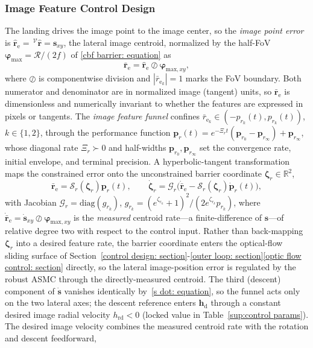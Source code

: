 \documentclass{IEEEtaes}
\begin{document}
\subsubsection{Image Feature Control Design} \label{image point control: section}
The landing drives the image point to the image center, so the \emph{image point error} is $\hat{\boldsymbol{r}}_\text{e}=\,^\mathcal{V}\hat{\boldsymbol{r}}=\boldsymbol{s}_{xy}$, the lateral image centroid, normalized by the half-FoV $\boldsymbol{\varphi}_\text{max}=\mathcal{R}/(2f)$ of \eqref{cbf barrier: equation} as
\begin{equation} \label{normalized error: equation}
    \bar{\boldsymbol{r}}_\text{e} = \hat{\boldsymbol{r}}_\text{e}\oslash\boldsymbol{\varphi}_{\text{max},xy},
\end{equation}
where $\oslash$ is componentwise division and $|\bar{r}_{\text{e}_k}|=1$ marks the FoV boundary. Both numerator and denominator are in normalized image (tangent) units, so $\bar{\boldsymbol{r}}_\text{e}$ is dimensionless and numerically invariant to whether the features are expressed in pixels or tangents. The \emph{image feature funnel} confines $\bar{r}_{\text{e}_k}\in(-p_{r_k}(t),p_{r_k}(t))$, $k\in\{1,2\}$, through the performance function $\boldsymbol{p}_r(t)=e^{-\Xi_r t}(\boldsymbol{p}_{r_0}-\boldsymbol{p}_{r_\infty})+\boldsymbol{p}_{r_\infty}$, whose diagonal rate $\Xi_r\succ 0$ and half-widths $\boldsymbol{p}_{r_0},\boldsymbol{p}_{r_\infty}$ set the convergence rate, initial envelope, and terminal precision. A hyperbolic-tangent transformation maps the constrained error onto the unconstrained barrier coordinate $\boldsymbol{\zeta}_r\in\mathbb{R}^2$,
\begin{equation} \label{image funnel transform: equation}
    \bar{\boldsymbol{r}}_\text{e}=\mathcal{S}_r(\boldsymbol{\zeta}_r)\boldsymbol{p}_r(t),\qquad \dot{\boldsymbol{\zeta}}_r=\mathcal{G}_r\big(\dot{\bar{\boldsymbol{r}}}_\text{e}-\mathcal{S}_r(\boldsymbol{\zeta}_r)\dot{\boldsymbol{p}}_r(t)\big),
\end{equation}
with Jacobian $\mathcal{G}_r=\mathrm{diag}(g_{r_k})$, $g_{r_k}=(e^{\zeta_{r_k}}+1)^2/(2e^{\zeta_{r_k}}p_{r_k})$, where $\dot{\bar{\boldsymbol{r}}}_\text{e}=\dot{\boldsymbol{s}}_{xy}\oslash\boldsymbol{\varphi}_{\text{max},xy}$ is the \emph{measured} centroid rate---a finite-difference of $\boldsymbol{s}$---of relative degree two with respect to the control input. Rather than back-mapping $\boldsymbol{\zeta}_r$ into a desired feature rate, the barrier coordinate enters the optical-flow sliding surface of Section~\ref{control design: section}-\ref{outer loop: section}\ref{optic flow control: section} directly, so the lateral image-position error is regulated by the robust ASMC through the directly-measured centroid. The third (descent) component of $\dot{\boldsymbol{s}}$ vanishes identically by~\eqref{s dot: equation}, so the funnel acts only on the two lateral axes; the descent reference enters $\boldsymbol{h}_\text{d}$ through a constant desired image radial velocity $h_\text{rd}<0$ (locked value in Table~\ref{sup:control params}). The desired image velocity combines the measured centroid rate with the rotation and descent feedforward,
\end{document}
